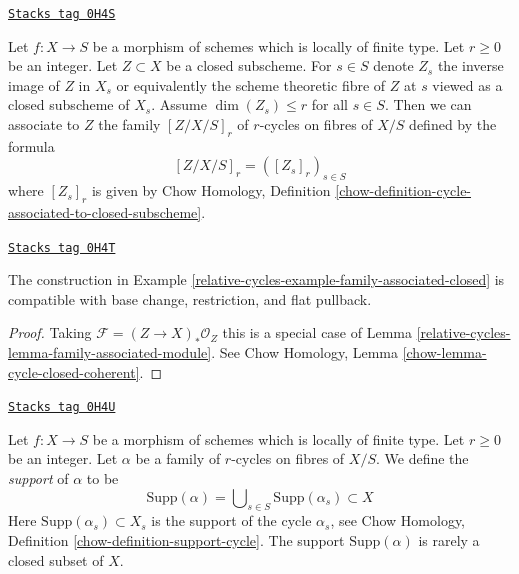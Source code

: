 \begin{example}
\label{relative-cycles-example-family-associated-closed}
\href{https://stacks.math.columbia.edu/tag/0H4S}{\texttt{Stacks tag 0H4S}}

Let $f : X \to S$ be a morphism of schemes which is locally of finite type.
Let $r \geq 0$ be an integer. Let $Z \subset X$ be a closed subscheme.
For $s \in S$ denote $Z_s$ the inverse image of $Z$ in $X_s$
or equivalently the scheme theoretic fibre of $Z$ at $s$ viewed
as a closed subscheme of $X_s$.
Assume $\dim(Z_s) \leq r$ for all $s \in S$.
Then we can associate to $Z$ the family $[Z/X/S]_r$
of $r$-cycles on fibres of $X/S$ defined by the formula
$$
[Z/X/S]_r = ([Z_s]_r)_{s \in S}
$$
where $[Z_s]_r$ is given by
Chow Homology, Definition
\ref{chow-definition-cycle-associated-to-closed-subscheme}.
\end{example}

\begin{lemma}
\label{relative-cycles-lemma-family-associated-closed}
\href{https://stacks.math.columbia.edu/tag/0H4T}{\texttt{Stacks tag 0H4T}}

The construction in Example \ref{relative-cycles-example-family-associated-closed}
is compatible with base change, restriction, and flat pullback.
\end{lemma}

\begin{proof}
Taking $\mathcal{F} = (Z \to X)_*\mathcal{O}_Z$ this is a special case of
Lemma \ref{relative-cycles-lemma-family-associated-module}. See
Chow Homology, Lemma \ref{chow-lemma-cycle-closed-coherent}.
\end{proof}

\begin{remark}[Support]

\label{relative-cycles-remark-supports-family}
\href{https://stacks.math.columbia.edu/tag/0H4U}{\texttt{Stacks tag 0H4U}}

Let $f : X \to S$ be a morphism of schemes which is locally of finite type.
Let $r \geq 0$ be an integer. Let $\alpha$ be a family of $r$-cycles
on fibres of $X/S$. We define the {\it support} of $\alpha$ to be
$$
\text{Supp}(\alpha) =
\bigcup\nolimits_{s \in S} \text{Supp}(\alpha_s) \subset X
$$
Here $\text{Supp}(\alpha_s) \subset X_s$ is the
support of the cycle $\alpha_s$, see
Chow Homology, Definition \ref{chow-definition-support-cycle}.
The support $\text{Supp}(\alpha)$ is rarely a closed subset of $X$.
\end{remark}

